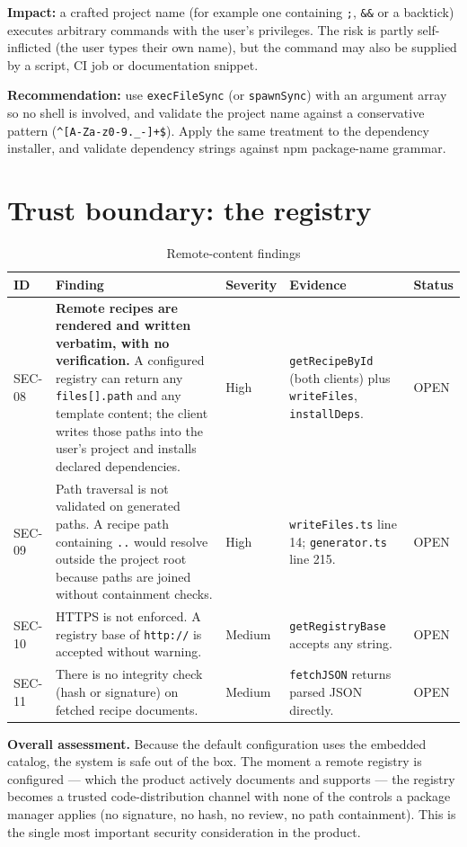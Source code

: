 \textbf{Impact:} a crafted project name (for example one containing
\texttt{;}, \texttt{\&\&} or a backtick) executes arbitrary commands with the user's
privileges. The risk is partly self-inflicted (the user types their own name), but
the command may also be supplied by a script, CI job or documentation snippet.

\textbf{Recommendation:} use \texttt{execFileSync} (or
\texttt{spawnSync}) with an argument array so no shell is involved, and validate
the project name against a conservative pattern
(\texttt{\^{}[A-Za-z0-9.\_-]+\$}). Apply the same treatment to the dependency
installer, and validate dependency strings against npm package-name grammar.

\section{Trust boundary: the registry}

\begin{longtable}{p{1.3cm}p{3.6cm}p{1.9cm}p{5.8cm}p{1.6cm}}
\caption{Remote-content findings}\\
\toprule
\textbf{ID} & \textbf{Finding} & \textbf{Severity} & \textbf{Evidence} & \textbf{Status} \\
\midrule

SEC-08 & \textbf{Remote recipes are rendered and written verbatim, with no
verification.} A configured registry can return any \texttt{files[].path} and any
template content; the client writes those paths into the user's project and
installs declared dependencies. & High &
\texttt{getRecipeById} (both clients) plus \texttt{writeFiles},
\texttt{installDeps}. & OPEN \\
SEC-09 & Path traversal is not validated on generated paths. A recipe path
containing \texttt{..} would resolve outside the project root because paths are
joined without containment checks. & High &
\texttt{writeFiles.ts} line 14; \texttt{generator.ts} line 215. & OPEN \\
SEC-10 & HTTPS is not enforced. A registry base of \texttt{http://} is accepted
without warning. & Medium & \texttt{getRegistryBase} accepts any string. & OPEN \\
SEC-11 & There is no integrity check (hash or signature) on fetched recipe
documents. & Medium & \texttt{fetchJSON} returns parsed JSON directly. & OPEN \\
\bottomrule
\end{longtable}

\textbf{Overall assessment.} Because the default configuration uses the embedded
catalog, the system is safe out of the box. The moment a remote registry is
configured --- which the product actively documents and supports --- the registry
becomes a trusted code-distribution channel with none of the controls a package
manager applies (no signature, no hash, no review, no path containment). This is
the single most important security consideration in the product.

